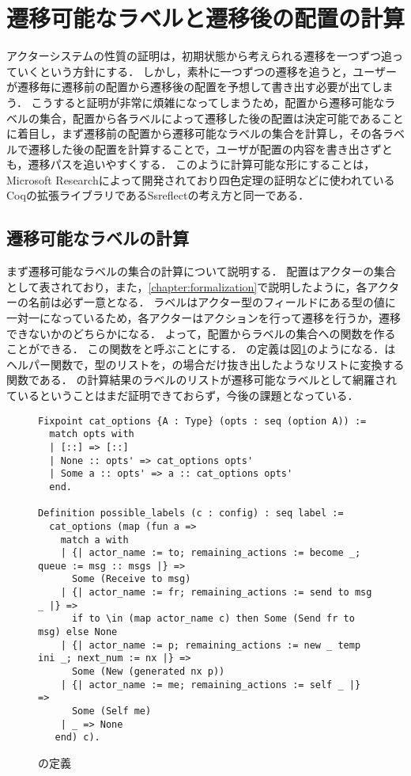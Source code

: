 \section{遷移可能なラベルと遷移後の配置の計算}

アクターシステムの性質の証明は，初期状態から考えられる遷移を一つずつ追っていくという方針にする．
しかし，素朴に一つずつの遷移を追うと，ユーザーが遷移毎に遷移前の配置から遷移後の配置を予想して書き出す必要が出てしまう．
こうすると証明が非常に煩雑になってしまうため，配置から遷移可能なラベルの集合，配置から各ラベルによって遷移した後の配置は決定可能であることに着目し，まず遷移前の配置から遷移可能なラベルの集合を計算し，その各ラベルで遷移した後の配置を計算することで，ユーザが配置の内容を書き出さずとも，遷移パスを追いやすくする．
このように計算可能な形にすることは，Microsoft Researchによって開発されており四色定理の証明などに使われているCoqの拡張ライブラリであるSsreflect\cite{ssreflect}の考え方と同一である．

\subsection{遷移可能なラベルの計算}

まず遷移可能なラベルの集合の計算について説明する．
配置はアクターの集合として表されており，また，\ref{chapter:formalization}で説明したように，各アクターの名前は必ず一意となる．
ラベルはアクター型のフィールドにある型の値に一対一になっているため，各アクターはアクションを行って遷移を行うか，遷移できないかのどちらかになる．
よって，配置からラベルの集合への関数を作ることができる．
この関数をと呼ぶことにする．
の定義は図\ref{code:proof:possible-labels}のようになる．はヘルパー関数で，型のリストを，の場合だけ抜き出したようなリストに変換する関数である．
の計算結果のラベルのリストが遷移可能なラベルとして網羅されているということはまだ証明できておらず，今後の課題となっている．


\begin{figure}
\begin{lstlisting}
Fixpoint cat_options {A : Type} (opts : seq (option A)) :=
  match opts with
  | [::] => [::]
  | None :: opts' => cat_options opts'
  | Some a :: opts' => a :: cat_options opts'
  end.

Definition possible_labels (c : config) : seq label :=
  cat_options (map (fun a =>
    match a with
    | {| actor_name := to; remaining_actions := become _; queue := msg :: msgs |} =>
      Some (Receive to msg)
    | {| actor_name := fr; remaining_actions := send to msg _ |} =>
      if to \in (map actor_name c) then Some (Send fr to msg) else None
    | {| actor_name := p; remaining_actions := new _ temp ini _; next_num := nx |} =>
      Some (New (generated nx p))
    | {| actor_name := me; remaining_actions := self _ |} =>
      Some (Self me)
    | _ => None
   end) c).
\end{lstlisting}
\caption{の定義}\label{code:proof:possible-labels}
\end{figure}


